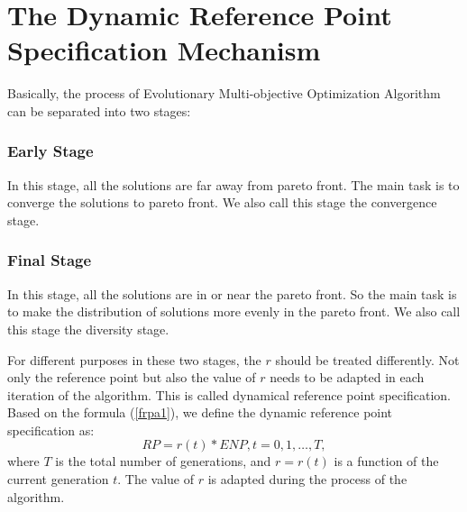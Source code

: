 \documentclass[conference]{IEEEtran}
\begin{document}
\section{The Dynamic Reference Point Specification Mechanism}
Basically, the process of Evolutionary Multi-objective Optimization Algorithm can be separated into
two stages:
\subsubsection{Early Stage} In this stage, 
all the solutions are far away from pareto front.
The main task is to converge the solutions to pareto front.
We also call this stage the convergence stage.
\subsubsection{Final Stage} In this stage,
all the solutions are in or near the pareto front.
So the main task is to make the distribution of solutions more evenly in the pareto front.
We also call this stage the diversity stage.

For different purposes in these two stages, the $r$ should be treated differently\cite{hisao:dynamic}. 
Not only the reference point but also the value of $r$ 
needs to be adapted in each iteration of the algorithm. 
This is called dynamical reference point specification. 
Based on the formula (\ref{frpa1}), 
we define the dynamic reference point specification as:
\begin{equation}\label{f2}
  RP = r(t) * ENP, t=0,1,\dots,T,
\end{equation}
where $T$ is the total number of generations, and $r=r(t)$ is a function of the current generation $t$.
The value of $r$ is adapted during the process of the algorithm. 

%
% 
\end{document}
